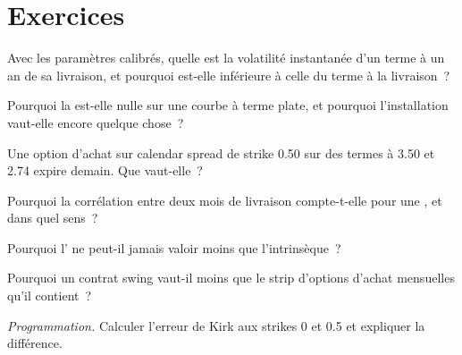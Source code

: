 \section{Exercices}

\begin{exercise}[$\star$]\label{exo:rc:commodity-and-energy-derivatives:1}
Avec les paramètres calibrés, quelle est la volatilité instantanée d'un terme à un an
de sa livraison, et pourquoi est-elle inférieure à celle du terme à la livraison~?
\end{exercise}

\begin{exercise}[$\star$]\label{exo:rc:commodity-and-energy-derivatives:2}
Pourquoi la  est-elle nulle sur une courbe à terme plate, et
pourquoi l'installation vaut-elle encore quelque chose~?
\end{exercise}

\begin{exercise}[$\star$]\label{exo:rc:commodity-and-energy-derivatives:3}
Une option d'achat sur calendar spread de strike 0.50 sur des termes à 3.50 et 2.74 expire demain.
Que vaut-elle~?
\end{exercise}

\begin{exercise}[$\star\star$]\label{exo:rc:commodity-and-energy-derivatives:4}
Pourquoi la corrélation entre deux mois de livraison compte-t-elle pour une ,
et dans quel sens~?
\end{exercise}

\begin{exercise}[$\star\star$]\label{exo:rc:commodity-and-energy-derivatives:5}
Pourquoi l' ne peut-il jamais valoir moins que l'intrinsèque~?
\end{exercise}

\begin{exercise}[$\star\star$]\label{exo:rc:commodity-and-energy-derivatives:6}
Pourquoi un contrat swing vaut-il moins que le strip d'options d'achat mensuelles qu'il contient~?
\end{exercise}

\begin{exercise}[$\star\star\star$]\label{exo:rc:commodity-and-energy-derivatives:7}
\emph{Programmation.} Calculer l'erreur de Kirk aux strikes 0 et 0.5 et expliquer la différence.
\end{exercise}

